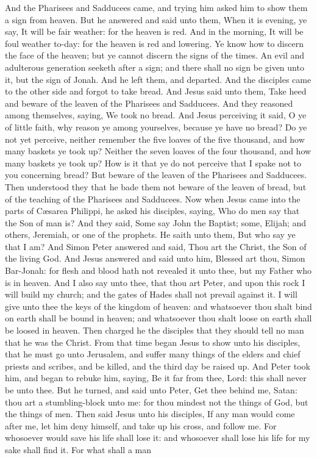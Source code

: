 And the Pharisees and Sadducees came, and trying him asked him to show them a sign from heaven. But he answered and said unto them, When it is evening, ye say, It will be fair weather: for the heaven is red. And in the morning, It will be foul weather to-day: for the heaven is red and lowering. Ye know how to discern the face of the heaven; but ye cannot discern the signs of the times. An evil and adulterous generation seeketh after a sign; and there shall no sign be given unto it, but the sign of Jonah. And he left them, and departed.  And the disciples came to the other side and forgot to take bread. And Jesus said unto them, Take heed and beware of the leaven of the Pharisees and Sadducees. And they reasoned among themselves, saying, We took no bread. And Jesus perceiving it said, O ye of little faith, why reason ye among yourselves, because ye have no bread? Do ye not yet perceive, neither remember the five loaves of the five thousand, and how many baskets ye took up? Neither the seven loaves of the four thousand, and how many baskets ye took up? How is it that ye do not perceive that I spake not to you concerning bread? But beware of the leaven of the Pharisees and Sadducees. Then understood they that he bade them not beware of the leaven of bread, but of the teaching of the Pharisees and Sadducees.  Now when Jesus came into the parts of Cæsarea Philippi, he asked his disciples, saying, Who do men say that the Son of man is? And they said, Some say John the Baptist; some, Elijah; and others, Jeremiah, or one of the prophets. He saith unto them, But who say ye that I am? And Simon Peter answered and said, Thou art the Christ, the Son of the living God. And Jesus answered and said unto him, Blessed art thou, Simon Bar-Jonah: for flesh and blood hath not revealed it unto thee, but my Father who is in heaven. And I also say unto thee, that thou art Peter, and upon this rock I will build my church; and the gates of Hades shall not prevail against it. I will give unto thee the keys of the kingdom of heaven: and whatsoever thou shalt bind on earth shall be bound in heaven; and whatsoever thou shalt loose on earth shall be loosed in heaven. Then charged he the disciples that they should tell no man that he was the Christ.  From that time began Jesus to show unto his disciples, that he must go unto Jerusalem, and suffer many things of the elders and chief priests and scribes, and be killed, and the third day be raised up. And Peter took him, and began to rebuke him, saying, Be it far from thee, Lord: this shall never be unto thee. But he turned, and said unto Peter, Get thee behind me, Satan: thou art a stumbling-block unto me: for thou mindest not the things of God, but the things of men. Then said Jesus unto his disciples, If any man would come after me, let him deny himself, and take up his cross, and follow me. For whosoever would save his life shall lose it: and whosoever shall lose his life for my sake shall find it. For what shall a man 